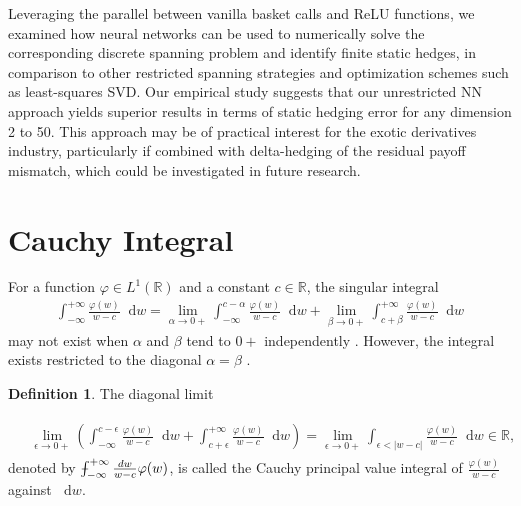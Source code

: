 \documentclass[11pt,A4,twoside]{article}
\numberwithin{equation}{section}
\renewcommand*\d{\mathop{}\!\mathrm{d}}
\newcommand{\R}{\mathbbm{R}}
\def\Phint#1{\mathchoice
  {\XXint\displaystyle\textstyle{#1}}%
  {\XXint\textstyle\scriptstyle{#1}}%
  {\XXint\scriptstyle\scriptscriptstyle{#1}}%
  {\XXint\scriptscriptstyle\scriptscriptstyle{#1}}%
  \!\int}
\def\XXint#1#2#3{{\setbox0=\hbox{$#1{#2#3}{\int}$}
    \vcenter{\hbox{$#2#3$}}\kern-.5\wd0}}
\def\dashint{\Phint-}
\newcommand{\beqa}{\begin{eqnarray}}
\newcommand{\eeqa}{\end{eqnarray}}
\def\bal{\begin{aligned}}
\def\eal{\end{aligned}}
\def\bll#1{
\beqa\label{#1}\bal
}\def\lel{\eal\eeqa}
\newcommand{\beql}[1]{\bll{#1}}
\newcommand{\eeql}{\lel}
\theoremstyle{definition}
\newtheorem{definition}{Definition}[section]
\theoremstyle{remark}
\def\R{\mathbb{R}}
\begin{document}
Leveraging the parallel between vanilla basket calls and ReLU functions, we examined how neural networks can be used to numerically solve the corresponding discrete spanning problem and identify finite static hedges, in comparison to other restricted spanning strategies and optimization schemes such as least-squares SVD.  Our empirical study suggests that our unrestricted NN approach yields superior results in terms of static hedging error for any dimension 2 to 50.  This approach may be of practical interest for the exotic derivatives industry, particularly if combined with delta-hedging of the residual payoff mismatch, which could be investigated in future research.
 

\appendix


\section{Cauchy Integral}
\label{a:cauchy}

 For a function $\varphi\in L^1(\R)$ and a constant $c\in\R$, the singular integral
\begin{align*}
    \int_{-\infty}^{+\infty} \frac{\varphi(w)}{w-c} \d w = \lim_{\alpha \rightarrow 0+} \int_{-\infty}^{c-\alpha} \frac{\varphi(w)}{w-c} \d w + \lim_{\beta \rightarrow 0+} \int_{c+\beta}^{+\infty} \frac{\varphi(w)}{w-c} \d w
\end{align*}
may not exist when $\alpha$ and $\beta$ tend to $0\!+$ independently . However, the integral exists restricted to the diagonal $\alpha=\beta$ \citep[Section 1.5]{estrada2000singular}.%

\begin{definition} \label{d:cpvint}
 The diagonal limit
\beql{eq:def_cpv}
    &\lim_{\epsilon \rightarrow 0+}\left(\int_{-\infty}^{c-\epsilon} \frac{\varphi(w)}{w-c} \d w +  \int_{c+\epsilon}^{+\infty} \frac{\varphi(w)}{w-c} \d w \right)=\lim_{\epsilon \rightarrow 0+}\int_{\epsilon<|w-c|} \frac{\varphi(w)}{w-c} \d w \in \R,
\eeql
denoted by $\dashint_{-\infty}^{+\infty}\frac{d w}{w-c} \varphi(w)$,
is called the Cauchy principal value 
integral of $\frac{\varphi(w)}{w-c} $ against $\d w$.
\end{definition}

\end{document}

